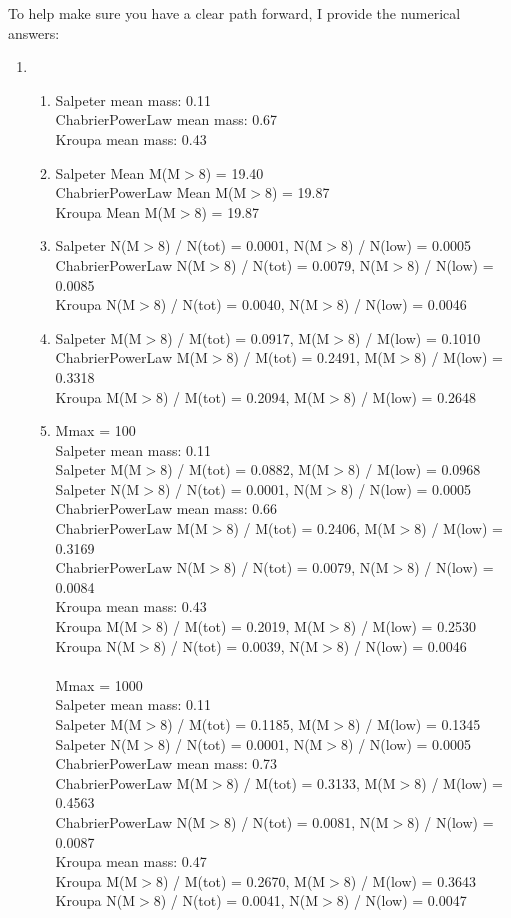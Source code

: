 \documentclass{article}
\begin{document}
\clearpage
To help make sure you have a clear path forward, I provide the numerical
answers:
\begin{enumerate}
    \item
\begin{enumerate}
    \item 
        Salpeter mean mass: 0.11 \\
ChabrierPowerLaw mean mass: 0.67 \\
Kroupa mean mass: 0.43
\item Salpeter Mean M(M$>$8) = 19.40\\
ChabrierPowerLaw Mean M(M$>$8) = 19.87\\
Kroupa Mean M(M$>$8) = 19.87
\item Salpeter N(M$>$8) / N(tot) = 0.0001, N(M$>$8) / N(low) = 0.0005 \\ 
ChabrierPowerLaw N(M$>$8) / N(tot) = 0.0079, N(M$>$8) / N(low) = 0.0085 \\
Kroupa N(M$>$8) / N(tot) = 0.0040, N(M$>$8) / N(low) = 0.0046
\item Salpeter M(M$>$8) / M(tot) = 0.0917, M(M$>$8) / M(low) = 0.1010 \\
ChabrierPowerLaw M(M$>$8) / M(tot) = 0.2491, M(M$>$8) / M(low) = 0.3318 \\
Kroupa M(M$>$8) / M(tot) = 0.2094, M(M$>$8) / M(low) = 0.2648
\item Mmax = 100 \\
Salpeter mean mass: 0.11 \\
Salpeter M(M$>$8) / M(tot) = 0.0882, M(M$>$8) / M(low) = 0.0968 \\
Salpeter N(M$>$8) / N(tot) = 0.0001, N(M$>$8) / N(low) = 0.0005 \\
ChabrierPowerLaw mean mass: 0.66 \\
ChabrierPowerLaw M(M$>$8) / M(tot) = 0.2406, M(M$>$8) / M(low) = 0.3169 \\
ChabrierPowerLaw N(M$>$8) / N(tot) = 0.0079, N(M$>$8) / N(low) = 0.0084 \\
Kroupa mean mass: 0.43 \\
Kroupa M(M$>$8) / M(tot) = 0.2019, M(M$>$8) / M(low) = 0.2530 \\
Kroupa N(M$>$8) / N(tot) = 0.0039, N(M$>$8) / N(low) = 0.0046 \\
 \\
Mmax = 1000 \\
Salpeter mean mass: 0.11 \\
Salpeter M(M$>$8) / M(tot) = 0.1185, M(M$>$8) / M(low) = 0.1345 \\
Salpeter N(M$>$8) / N(tot) = 0.0001, N(M$>$8) / N(low) = 0.0005 \\
ChabrierPowerLaw mean mass: 0.73 \\
ChabrierPowerLaw M(M$>$8) / M(tot) = 0.3133, M(M$>$8) / M(low) = 0.4563 \\
ChabrierPowerLaw N(M$>$8) / N(tot) = 0.0081, N(M$>$8) / N(low) = 0.0087 \\
Kroupa mean mass: 0.47 \\
Kroupa M(M$>$8) / M(tot) = 0.2670, M(M$>$8) / M(low) = 0.3643 \\
Kroupa N(M$>$8) / N(tot) = 0.0041, N(M$>$8) / N(low) = 0.0047 


\end{enumerate}
\end{enumerate}
\end{document}
